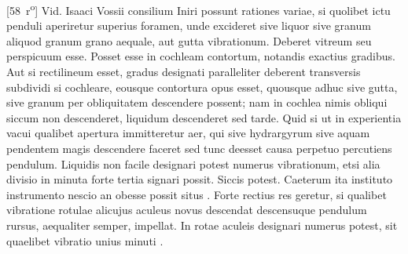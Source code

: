                 \vspace*{8mm}
               \pstart%
\noindent%
\normalsize%
[58~r\textsuperscript{o}]
\pend%
\pstart%
\noindent%
\centering%
\pend%
\vspace{0,5em}%
\pstart%
\noindent%
Vid. Isaaci Vossii\protect{} consilium
%
{} Iniri possunt rationes variae, si quolibet ictu  penduli aperiretur superius foramen, unde excideret  sive liquor sive granum aliquod granum grano aequale, aut gutta vibrationum. Deberet vitreum seu perspicuum esse.  Posset esse in cochleam\protect{} contortum, notandis exactius  gradibus. Aut si rectilineum esset, gradus designati  paralleliter deberent transversis subdividi  si cochleare, eousque contortura opus esset, quousque  adhuc sive gutta, sive granum per obliquitatem  descendere possent; nam in cochlea\protect{} nimis obliqui  siccum non descenderet, liquidum descenderet sed  tarde. Quid si ut in experientia vacui\protect{} qualibet  apertura immitteretur aer, qui sive hydrargyrum\protect{}  sive aquam pendentem magis descendere faceret  sed tunc deesset causa perpetuo percutiens pendulum\protect{}. Liquidis non facile designari potest  numerus vibrationum, etsi alia divisio in minuta  forte tertia signari possit. Siccis potest. Caeterum  ita instituto instrumento nescio an obesse possit  situs . Forte  rectius res geretur, si qualibet vibratione rotulae  alicujus aculeus novus descendat descensuque pendulum\protect{}  rursus, aequaliter semper, impellat. In rotae aculeis  designari numerus potest, sit   quaelibet vibratio unius minuti . 

